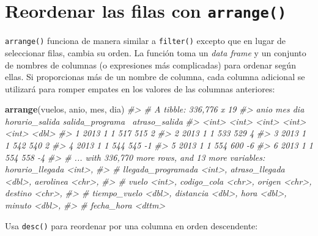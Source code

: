 \documentclass[11pt,oneside]{report}
\newenvironment{Shaded}{\begin{snugshade}}{\end{snugshade}}
\newcommand{\CommentTok}[1]{\textcolor[rgb]{0.56,0.35,0.01}{\textit{#1}}}
\newcommand{\KeywordTok}[1]{\textcolor[rgb]{0.13,0.29,0.53}{\textbf{#1}}}
\newcommand{\NormalTok}[1]{#1}
\begin{document}
\hypertarget{reordenar-las-filas-con-arrange}{%
\section{\texorpdfstring{Reordenar las filas con
\texttt{arrange()}}{Reordenar las filas con arrange()}}\label{reordenar-las-filas-con-arrange}}

\texttt{arrange()} funciona de manera similar a \texttt{filter()}
excepto que en lugar de seleccionar filas, cambia su orden. La función
toma un \emph{data frame} y un conjunto de nombres de columnas (o
expresiones más complicadas) para ordenar según ellas. Si proporcionas
más de un nombre de columna, cada columna adicional se utilizará para
romper empates en los valores de las columnas anteriores:

\begin{Shaded}
\begin{Highlighting}[]
\KeywordTok{arrange}\NormalTok{(vuelos, anio, mes, dia)}
\CommentTok{#> # A tibble: 336,776 x 19}
\CommentTok{#>    anio   mes   dia horario_salida salida_programa~ atraso_salida}
\CommentTok{#>   <int> <int> <int>          <int>            <int>         <dbl>}
\CommentTok{#> 1  2013     1     1            517              515             2}
\CommentTok{#> 2  2013     1     1            533              529             4}
\CommentTok{#> 3  2013     1     1            542              540             2}
\CommentTok{#> 4  2013     1     1            544              545            -1}
\CommentTok{#> 5  2013     1     1            554              600            -6}
\CommentTok{#> 6  2013     1     1            554              558            -4}
\CommentTok{#> # ... with 336,770 more rows, and 13 more variables: horario_llegada <int>,}
\CommentTok{#> #   llegada_programada <int>, atraso_llegada <dbl>, aerolinea <chr>,}
\CommentTok{#> #   vuelo <int>, codigo_cola <chr>, origen <chr>, destino <chr>,}
\CommentTok{#> #   tiempo_vuelo <dbl>, distancia <dbl>, hora <dbl>, minuto <dbl>,}
\CommentTok{#> #   fecha_hora <dttm>}
\end{Highlighting}
\end{Shaded}

Usa \texttt{desc()} para reordenar por una columna en orden descendente:
\end{document}
